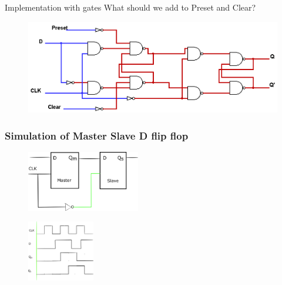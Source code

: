 \documentclass{beamer}
\begin{document}
\begin{frame}{Implementation with gates}
    \alert{What should we add to Preset and Clear?}\pause
    
    
    \begin{figure}[H]
        \centering
        
        \includegraphics[scale=.35]{images/withPresetClear.png}
        
        
        \label{fig:my_label}
    \end{figure}
    
\end{frame}

\begin{frame}
\frametitle{Simulation of Master Slave D flip flop}
\begin{figure}[h]
    \includegraphics[width=.7\textwidth,height=100px]{name/path2.png}
\end{figure}
\begin{figure}[h]
    \includegraphics[width=.7\textwidth,height=100px]{name/clk0.png}
\end{figure}
\end{frame}
\end{document}
